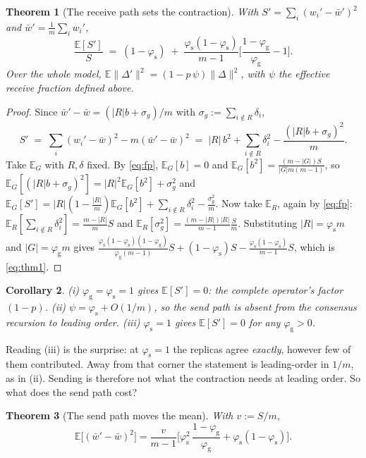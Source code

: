 \documentclass{article}
\theoremstyle{plain}
\newtheorem{theorem}{Theorem}
\newtheorem{corollary}[theorem]{Corollary}
\newcommand{\sg}{\sigma_g}
\newcommand{\pg}{\varphi_{\mathrm{g}}}
\newcommand{\ps}{\varphi_{\mathrm{s}}}
\newcommand{\E}{\mathbb{E}}
\begin{document}
\begin{theorem}[The receive path sets the contraction]\label{thm:contraction}
With $S' = \sum_i(w_i' - \bar w')^2$ and $\bar w' = \frac1m\sum_i w_i'$,
\begin{equation}\label{eq:thm1}
\frac{\E[S']}{S} \;=\; (1-\ps)
  \;+\; \frac{\ps(1-\ps)}{m-1}\Big[\frac{1-\pg}{\pg}-1\Big].
\end{equation}
Over the whole model, $\E\|\Delta'\|^2 = (1-p\,\psi)\|\Delta\|^2$, with $\psi$
the effective receive fraction defined above.
\end{theorem}

\begin{proof}
Since $\bar w' - \bar w = (|R|b + \sg)/m$ with $\sg := \sum_{i\notin R}\delta_i$,
\[
S' \;=\; \sum_i (w_i'-\bar w)^2 - m(\bar w'-\bar w)^2
   \;=\; |R|\,b^2 + \!\!\sum_{i\notin R}\!\delta_i^2 - \frac{(|R|b+\sg)^2}{m}.
\]
Take $\E_G$ with $R,\delta$ fixed. By \eqref{eq:fp}, $\E_G[b] = 0$ and
$\E_G[b^2] = \frac{(m-|G|)S}{|G|m(m-1)}$, so
$\E_G[(|R|b+\sg)^2] = |R|^2\E_G[b^2] + \sg^2$ and
$\E_G[S'] = |R|(1-\frac{|R|}{m})\E_G[b^2] + \sum_{i\notin R}\delta_i^2 -
\frac{\sg^2}{m}$. Now take $\E_R$, again by \eqref{eq:fp}:
$\E_R[\sum_{i\notin R}\delta_i^2] = \frac{m-|R|}{m}S$ and
$\E_R[\sg^2] = \frac{(m-|R|)|R|}{m-1}\frac{S}{m}$. Substituting $|R| = \ps m$
and $|G| = \pg m$ gives $\frac{\ps(1-\ps)(1-\pg)}{\pg(m-1)}S + (1-\ps)S -
\frac{\ps(1-\ps)}{m-1}S$, which is \eqref{eq:thm1}.
\end{proof}

\begin{corollary}\label{cor:reads}
\textnormal{(i)} $\pg{=}\ps{=}1$ gives $\E[S'] = 0$: the complete operator's
factor $(1-p)$. \textnormal{(ii)} $\psi = \ps + O(1/m)$, so the send path is
absent from the consensus recursion to leading order. \textnormal{(iii)}
$\ps = 1$ gives $\E[S'] = 0$ for \emph{any} $\pg > 0$.
\end{corollary}

Reading (iii) is the surprise: at $\ps = 1$ the replicas agree \emph{exactly},
however few of them contributed. Away from that corner the statement is
leading-order in $1/m$, as in (ii). Sending is therefore not what the
contraction needs at leading order. So what does the send path cost?

\begin{theorem}[The send path moves the mean]\label{thm:mean}
With $v := S/m$,
\begin{equation}\label{eq:thm2}
\E\big[(\bar w' - \bar w)^2\big]
 = \frac{v}{m-1}\Big[\ps^2\,\frac{1-\pg}{\pg} + \ps(1-\ps)\Big].
\end{equation}
\end{theorem}
\end{document}
